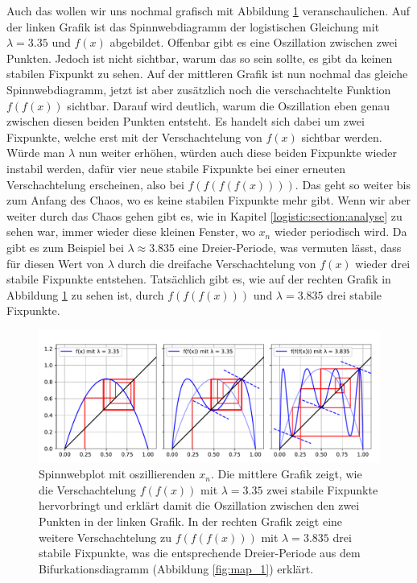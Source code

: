 Auch das wollen wir uns nochmal grafisch mit
Abbildung \ref{fig:web_2} veranschaulichen.  
Auf der linken Grafik ist das Spinnwebdiagramm der 
logistischen Gleichung mit $\lambda = 3.35$ und
$f(x)$ abgebildet. 
Offenbar gibt es eine Oszillation zwischen zwei Punkten.
Jedoch ist nicht sichtbar, warum das so sein sollte,
es gibt da keinen stabilen Fixpunkt zu sehen.
Auf der mittleren Grafik ist nun nochmal das gleiche
Spinnwebdiagramm, jetzt ist aber zusätzlich noch
die verschachtelte Funktion $f(f(x))$ sichtbar.
Darauf wird deutlich, warum die Oszillation eben genau 
zwischen diesen beiden Punkten entsteht. 
Es handelt sich dabei um zwei Fixpunkte, welche erst 
mit der Verschachtelung von $f(x)$ sichtbar werden.
Würde man $\lambda$ nun weiter erhöhen, würden auch
diese beiden Fixpunkte wieder instabil werden,
dafür vier neue stabile Fixpunkte bei einer erneuten
Verschachtelung erscheinen, 
also bei $f(f(f(f(x))))$. 
Das geht so weiter bis zum Anfang des Chaos, wo
es keine stabilen Fixpunkte mehr gibt. 
Wenn wir aber weiter durch das Chaos gehen gibt es, 
wie in Kapitel \ref{logistic:section:analyse}
zu sehen war, immer wieder diese kleinen Fenster,
wo $x_n$ wieder periodisch wird. 
Da gibt es zum Beispiel bei
$\lambda \approx 3.835$ eine Dreier-Periode,
was vermuten lässt, dass für diesen Wert
von $\lambda$ durch die dreifache Verschachtelung
von $f(x)$ wieder drei stabile Fixpunkte entstehen.
Tatsächlich gibt es, wie auf der rechten Grafik 
in Abbildung \ref{fig:web_2} zu sehen ist,
durch $f(f(f(x)))$ und $\lambda = 3.835$ drei stabile Fixpunkte. 

\begin{figure}
    \includegraphics[width=\linewidth]{papers/logistic/figures/web_2.pdf}
    \caption{
        Spinnwebplot mit oszillierenden $x_n$. 
        Die mittlere Grafik zeigt, wie 
        die Verschachtelung $f(f(x))$ mit 
        $\lambda = 3.35$ zwei
        stabile Fixpunkte hervorbringt und erklärt
        damit die Oszillation zwischen
        den zwei Punkten in der linken Grafik.
        In der rechten Grafik zeigt eine weitere 
        Verschachtelung zu $f(f(f(x)))$
        mit $\lambda = 3.835$ 
        drei stabile Fixpunkte, was
        die entsprechende Dreier-Periode aus dem 
        Bifurkationsdiagramm (Abbildung \ref{fig:map_1})
        erklärt. 
    }
    \label{fig:web_2}
\end{figure}

